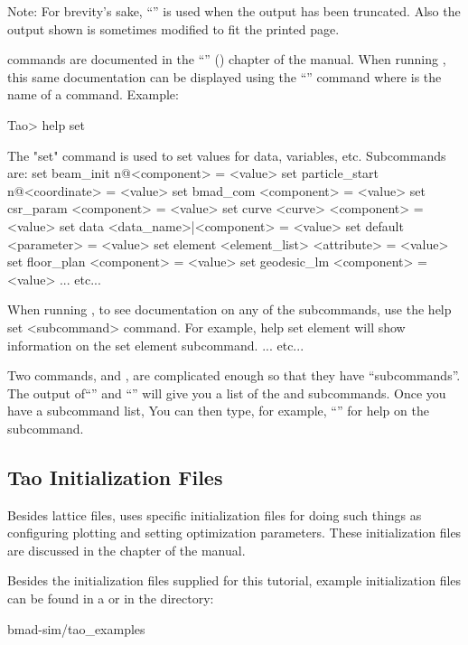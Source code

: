 \documentclass{hitec}     %
\begin{document}
Note: For brevity's sake, ``'' is used when the output has been truncated. Also the output shown
is sometimes modified to fit the printed page.

\tao commands are documented in the ``'' () chapter of the \tao
manual.  When running \tao, this same documentation can be displayed using the ``'' command where  is the name of a command. Example:
\begin{code}
Tao> help set

The "set" command is used to set values for data, variables, etc. 
Subcommands are:
  set beam_init {n@}<component> = <value>
  set particle_start {n@}<coordinate> = <value>
  set bmad_com <component> = <value>
  set csr_param <component> = <value>
  set curve <curve> <component> = <value>
  set data <data_name>|<component> = <value>
  set default <parameter> = <value>
  set element <element_list> <attribute> = <value>
  set floor_plan <component> = <value>
  set geodesic_lm <component> = <value>
... etc...

When running \tao, to see documentation on any of the subcommands, use the 
help set <subcommand> command. For example, help set element
will show information on the set element subcommand.
... etc...
\end{code}

Two commands,  and , are complicated enough so that they have ``subcommands''. The
output of``'' and ``'' will give you a list of the  and 
subcommands. Once you have a subcommand list, You can then type, for example, ``'' for help on the  subcommand.

\subsection{Tao Initialization Files}
\label{s:init.file}

Besides lattice files, \tao uses \tao specific initialization files for doing such things as
configuring plotting and setting optimization parameters. These initialization files are discussed
in the  chapter of the \tao manual.

Besides the initialization files supplied for this tutorial, example \tao initialization files can
be found in a  or  in the directory:
\begin{code}
bmad-sim/tao_examples
\end{code}
\end{document}
